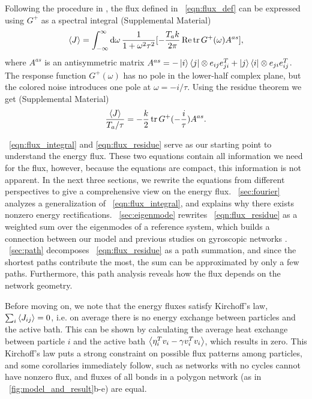 \documentclass[
 preprint,
 preprintnumbers,
 amsmath,amssymb,
 aps,
 pre,
 longbibliography,
 10pt, twocolumn
]{revtex4-1}
\begin{document}
Following the procedure in \cite{Kundu2011LargeChains}, the flux defined in \eqnname~\eqref{eqn:flux_def} can be expressed using $G^+$ as a spectral integral (Supplemental Material)
\begin{equation} \label{eqn:flux_integral}
    \expval{J} = \int_{-\infty}^\infty \dd{\omega} \frac{1}{1+\omega^2\tau^2} [-\frac{T_a k}{2\pi} \Re \tr G^+(\omega)A^{as}] ,
\end{equation}
where $A^{as}$ is an antisymmetric matrix
$A^{as} = -\ket{i}\bra{j} \otimes e_{ij}e_{ji}^T + \ket{j}\bra{i} \otimes e_{ji}e_{ij}^T$.
The response function $G^+(\omega)$ has no pole in the lower-half complex plane, but the colored noise introduces one pole at $\omega = -i/\tau$. Using the residue theorem we get (Supplemental Material)
\begin{equation} \label{eqn:flux_residue}
    \frac{\expval{J}}{T_a/\tau} = -\frac{k}{2} \tr G^+(-\frac{i}{\tau})A^{as} .
\end{equation}

\eqnname~\eqref{eqn:flux_integral} and \eqref{eqn:flux_residue} serve as our starting point to understand the energy flux.
These two equations contain all information we need for the flux, however, because the equations are compact, this information is not apparent. In the next three sections, we rewrite the equations from different perspectives to give a comprehensive view on the energy flux.
\secname~\ref{sec:fourier} analyzes a generalization of \eqnname~\eqref{eqn:flux_integral}, and explains why there exists nonzero energy rectifications.
\secname~\ref{sec:eigenmode} rewrites \eqnname~\eqref{eqn:flux_residue} as a weighted sum over the eigenmodes of a reference system, which builds a connection between our model and previous studies on gyroscopic networks \cite{Nash2015TopologicalMetamaterials,Mitchell2018AmorphousSets}.
\secname~\ref{sec:path} decomposes \eqnname~\eqref{eqn:flux_residue} as a path summation, and since the shortest paths contribute the most, the sum can be approximated by only a few paths. Furthermore, this path analysis reveals how the flux depends on the network geometry.

Before moving on, we note that the energy fluxes satisfy Kirchoff's law, $\sum_i \expval{J_{ij}} = 0$, i.e. on average there is no energy exchange between particles and the active bath. This can be shown by calculating the average heat exchange between particle $i$ and the active bath $\expval{\eta_i^T v_i - \gamma v_i^T v_i}$, which results in zero.
This Kirchoff's law puts a strong constraint on possible flux patterns among particles, and some corollaries immediately follow, such as networks with no cycles cannot have nonzero flux, and fluxes of all bonds in a polygon network (as in \figurename~\ref{fig:model_and_result}b-e) are equal.
\end{document}
